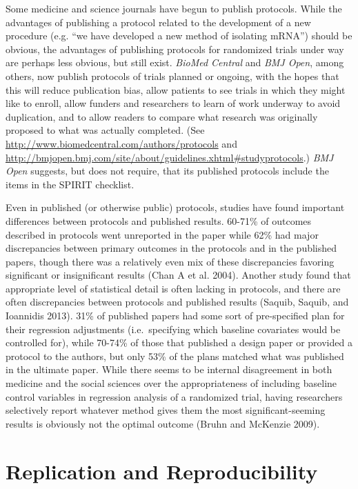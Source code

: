 \documentclass[12pt] {article}
\begin{document}
 Some medicine and science journals have begun to publish protocols.   While the
advantages of publishing a protocol related to the development of a new
procedure (e.g. ``we have developed a new method of isolating mRNA'')
should be obvious, the advantages of publishing protocols for randomized
trials under way are perhaps less obvious, but still exist. \emph{BioMed
Central} and \emph{BMJ Open}, among others, now publish protocols of
trials planned or ongoing, with the hopes that this will reduce
publication bias, allow patients to see trials in which they might like
to enroll, allow funders and researchers to learn of work underway to
avoid duplication, and to allow readers to compare what research was
originally proposed to what was actually completed. (See
\url{http://www.biomedcentral.com/authors/protocols} and
\url{http://bmjopen.bmj.com/site/about/guidelines.xhtml\#studyprotocols}.)
\emph{BMJ Open} suggests, but does not require, that its published
protocols include the items in the SPIRIT checklist.

Even in published (or otherwise public) protocols, studies have found
important differences between protocols and published results. 60-71\%
of outcomes described in protocols went unreported in the paper while
62\% had major discrepancies between primary outcomes in the protocols
and in the published papers, though there was a relatively even mix of
these discrepancies favoring significant or insignificant results (Chan
A et al. 2004). Another study found that appropriate level of
statistical detail is often lacking in protocols, and there are often
discrepancies between protocols and published results (Saquib, Saquib,
and Ioannidis 2013). 31\% of published papers had some sort of
pre-specified plan for their regression adjustments (i.e.~specifying
which baseline covariates would be controlled for), while 70-74\% of
those that published a design paper or provided a protocol to the
authors, but only 53\% of the plans matched what was published in the
ultimate paper. While there seems to be internal disagreement in both
medicine and the social sciences over the appropriateness of including baseline
control variables in regression analysis of a randomized trial, having
researchers selectively report whatever method gives them the most
significant-seeming results is obviously not the optimal outcome (Bruhn
and McKenzie 2009).

\section{Replication and
Reproducibility}\label{replication-and-reproducibility}
\end{document}
